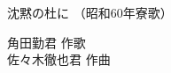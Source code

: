 \documentclass[10pt,b5j]{tarticle} %
\begin{document}
\begin{minipage}[c]{0.7\hsize} %
    \begin{center}
        {\LARGE
            沈黙の杜に %
        }
        {\small 
            （昭和60年寮歌） %
        }
    \end{center}
\end{minipage}
\begin{minipage}[c]{0.3\hsize} %
    \begin{flushright} %
        角田勤君 作歌\\佐々木徹也君 作曲 %
    \end{flushright}
\end{minipage}
\end{document}
